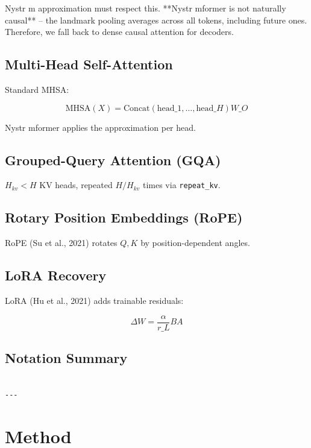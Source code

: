 Nystr m approximation must respect this. **Nystr mformer is not naturally 
causal** -- the landmark pooling averages across all tokens, including 
future ones. Therefore, we fall back to dense causal attention for decoders.

\subsection{Multi-Head Self-Attention}

Standard MHSA:

\[
\text{MHSA}(X) = \mathrm{Concat}(\text{head}\_1, \dots, \text{head}\_H) W\_O
\tag{3.9}
\]

Nystr mformer applies the approximation per head.

\subsection{Grouped-Query Attention (GQA)}

$H_{kv} < H$ KV heads, repeated $H / H_{kv}$ times via \texttt{repeat\_kv}.

\subsection{Rotary Position Embeddings (RoPE)}

RoPE (Su et al., 2021) rotates $Q, K$ by position-dependent angles.

\subsection{LoRA Recovery}

LoRA (Hu et al., 2021) adds trainable residuals:

\[
\Delta W = \frac{\alpha}{r\_L} B A
\tag{3.10}
\]

\subsection{Notation Summary}

\begin{lstlisting}

---
\end{lstlisting}


\section{Method}

